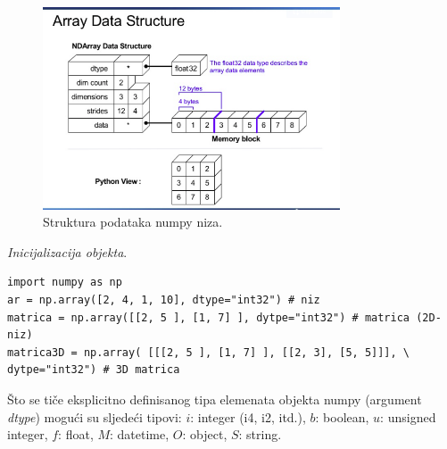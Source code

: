 \begin{figure}%
	\centering
	\includegraphics[width=250pt,height=170pt]{slike/numpy_array.png}

	\caption{Struktura podataka numpy niza.}	 \label{fig:numpy_array}
 
\end{figure} 

\textit{Inicijalizacija objekta}. 
\begin{verbatim}
import numpy as np
ar = np.array([2, 4, 1, 10], dtype="int32") # niz
matrica = np.array([[2, 5 ], [1, 7] ], dytpe="int32") # matrica (2D-niz)
matrica3D = np.array( [[[2, 5 ], [1, 7] ], [[2, 3], [5, 5]]], \ 
dytpe="int32") # 3D matrica
\end{verbatim}
 
Što se tiče eksplicitno definisanog tipa elemenata objekta numpy (argument \emph{dtype}) mogući su sljedeći tipovi:  $i$: integer (i4, i2, itd.),  $b$: boolean, $u$: unsigned integer, $f$: float,  $M$: datetime, $O$: object, $S$: string. 

